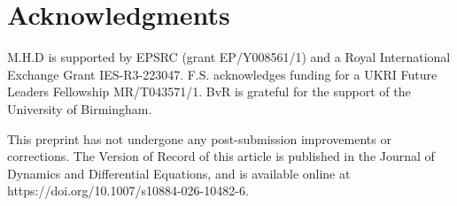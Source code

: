 \documentclass[]{article}
\theoremstyle{remark}
\begin{document}
\section*{Acknowledgments}
M.H.D is supported by EPSRC (grant EP/Y008561/1) and a Royal International Exchange Grant IES-R3-223047. F.S. acknowledges funding for a UKRI Future Leaders Fellowship MR/T043571/1. BvR is grateful for the support of the University of Birmingham.


This preprint has not undergone any post-submission improvements or corrections. The Version of Record of this article is
published in the Journal of Dynamics and Differential Equations, and is available online at https://doi.org/10.1007/s10884-026-10482-6.


\printbibliography
\end{document}
